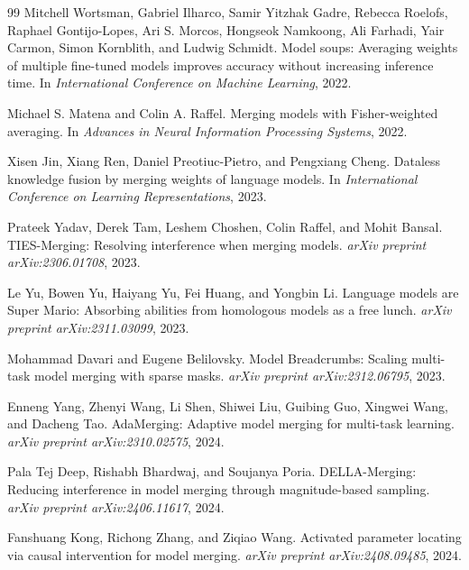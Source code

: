 \documentclass[11pt]{article}
\begin{document}
\begin{thebibliography}{99}
Mitchell Wortsman, Gabriel Ilharco, Samir Yitzhak Gadre, Rebecca Roelofs, Raphael Gontijo-Lopes, Ari S. Morcos, Hongseok Namkoong, Ali Farhadi, Yair Carmon, Simon Kornblith, and Ludwig Schmidt.
\newblock Model soups: Averaging weights of multiple fine-tuned models improves accuracy without increasing inference time.
\newblock In \emph{International Conference on Machine Learning}, 2022.

Michael S. Matena and Colin A. Raffel.
\newblock Merging models with Fisher-weighted averaging.
\newblock In \emph{Advances in Neural Information Processing Systems}, 2022.

Xisen Jin, Xiang Ren, Daniel Preotiuc-Pietro, and Pengxiang Cheng.
\newblock Dataless knowledge fusion by merging weights of language models.
\newblock In \emph{International Conference on Learning Representations}, 2023.

Prateek Yadav, Derek Tam, Leshem Choshen, Colin Raffel, and Mohit Bansal.
\newblock TIES-Merging: Resolving interference when merging models.
\newblock \emph{arXiv preprint arXiv:2306.01708}, 2023.

Le Yu, Bowen Yu, Haiyang Yu, Fei Huang, and Yongbin Li.
\newblock Language models are Super Mario: Absorbing abilities from homologous models as a free lunch.
\newblock \emph{arXiv preprint arXiv:2311.03099}, 2023.

Mohammad Davari and Eugene Belilovsky.
\newblock Model Breadcrumbs: Scaling multi-task model merging with sparse masks.
\newblock \emph{arXiv preprint arXiv:2312.06795}, 2023.

Enneng Yang, Zhenyi Wang, Li Shen, Shiwei Liu, Guibing Guo, Xingwei Wang, and Dacheng Tao.
\newblock AdaMerging: Adaptive model merging for multi-task learning.
\newblock \emph{arXiv preprint arXiv:2310.02575}, 2024.

Pala Tej Deep, Rishabh Bhardwaj, and Soujanya Poria.
\newblock DELLA-Merging: Reducing interference in model merging through magnitude-based sampling.
\newblock \emph{arXiv preprint arXiv:2406.11617}, 2024.

Fanshuang Kong, Richong Zhang, and Ziqiao Wang.
\newblock Activated parameter locating via causal intervention for model merging.
\newblock \emph{arXiv preprint arXiv:2408.09485}, 2024.


\end{thebibliography}
\end{document}
